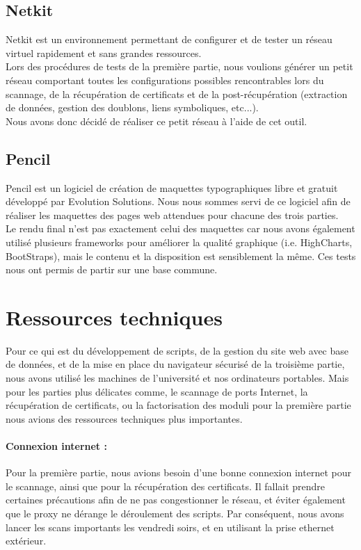 \subsection{Netkit}

Netkit est un environnement permettant de configurer et de tester un réseau virtuel rapidement et sans grandes ressources.\\
Lors des procédures de tests de la première partie, nous voulions générer un petit réseau comportant toutes les configurations possibles rencontrables lors du scannage, de la récupération de certificats et de la post-récupération (extraction de données, gestion des doublons, liens symboliques, etc...).\\
Nous avons donc décidé de réaliser ce petit réseau à l'aide de cet outil.

\subsection{Pencil}

Pencil \cite{pencil} est un logiciel de création de maquettes typographiques libre et gratuit développé par Evolution Solutions.
Nous nous sommes servi de ce logiciel afin de réaliser les maquettes des pages web attendues pour chacune des trois parties.\\
Le rendu final n'est pas exactement celui des maquettes car nous avons également utilisé plusieurs frameworks pour améliorer la qualité graphique (i.e. HighCharts, BootStraps), mais le contenu et la disposition est sensiblement la même.
Ces tests nous ont permis de partir sur une base commune.

\section{Ressources techniques}

Pour ce qui est du développement de scripts, de la gestion du site web avec base de données, et de la mise en place du navigateur sécurisé de la troisième partie, nous avons utilisé les machines de l'université et nos ordinateurs portables. Mais pour les parties plus délicates comme, le scannage de ports Internet, la récupération de certificats, ou la factorisation des moduli pour la première partie nous avions des ressources techniques plus importantes.

\paragraph{Connexion internet : } Pour la première partie, nous avions besoin d'une bonne connexion internet pour le scannage, ainsi que pour la récupération des certificats. Il fallait prendre certaines précautions afin de ne pas congestionner le réseau, et éviter également que le proxy ne dérange le déroulement des scripts. Par conséquent, nous avons lancer les scans importants les vendredi soirs, et en utilisant la prise ethernet extérieur.

